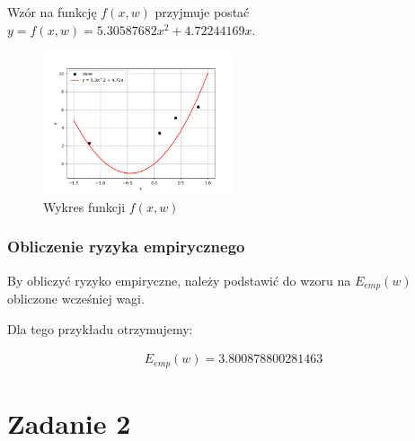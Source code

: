 \documentclass{article}
\begin{document}
Wzór na funkcję $f(x, w)$ przyjmuje postać $y = f(x, w) = 5.30587682x^2 + 4.72244169x$.

\begin{figure}[H]
    \centering
    \includegraphics[width=0.5\textwidth]{plot.png}
    \caption{Wykres funkcji $f(x, w)$}
\end{figure}

\subsubsection{Obliczenie ryzyka empirycznego}
By obliczyć ryzyko empiryczne, należy podstawić do wzoru na $E_{emp}(w)$ obliczone wcześniej
wagi. 

Dla tego przykładu otrzymujemy:

\begin{equation*}
    \begin{aligned}
    E_{emp}(w) = 3.800878800281463
    \end{aligned}
\end{equation*}

\section{Zadanie 2}
\end{document}
